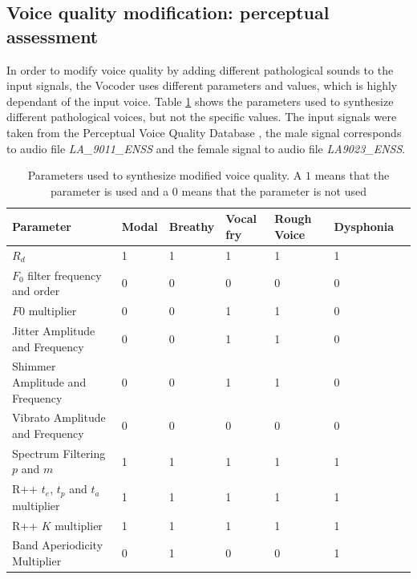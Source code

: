 \documentclass[final,5p,times,twocolumn]{elsarticle}
\begin{document}
\subsection{Voice quality modification: perceptual assessment}
\label{sec:perceptual}

In order to modify voice quality by adding different pathological sounds to the input signals, the Vocoder uses different parameters and values, which is highly dependant of the input voice. Table \ref{tab:vqm} shows the parameters used to synthesize different pathological voices, but not the specific values. The input signals were taken from the Perceptual Voice Quality Database \cite{pvqd}, the male signal corresponds to audio file \textit{LA\_9011\_ENSS} and the female signal to audio file \textit{LA9023\_ENSS}.

\begin{table}[!htpb]
    \centering
    \begin{tabular}{p{} p{} p{} p{} p{} p{} p{}}
        \hline \hline
        Parameter & Modal & Breathy  & Vocal fry & Rough Voice & Dysphonia \\ \hline
        $R_d$                                   & 1 & 1 & 1 & 1 & 1 \\
        $F_0$ filter frequency and order        & 0 & 0 & 0 & 0 & 0 \\
        $F0$ multiplier                         & 0 & 0 & 1 & 1 & 0 \\
        Jitter Amplitude and Frequency          & 0 & 0 & 1 & 1 & 0 \\
        Shimmer Amplitude and Frequency         & 0 & 0 & 1 & 1 & 0 \\
        Vibrato Amplitude and Frequency         & 0 & 0 & 0 & 0 & 0 \\
        Spectrum Filtering $p$ and $m$          & 1 & 1 & 1 & 1 & 1 \\
        R++ $t_e$, $t_p$ and $t_a$ multiplier   & 1 & 1 & 1 & 1 & 1 \\
        R++ $K$ multiplier                      & 1 & 1 & 1 & 1 & 1 \\
        Band Aperiodicity Multiplier            & 0 & 1 & 0 & 0 & 1 \\ \hline \hline
    \end{tabular}
    \caption{Parameters used to synthesize modified voice quality. A $1$ means that the parameter is used and a $0$ means that the parameter is not used}
    \label{tab:vqm}
\end{table}
\end{document}
